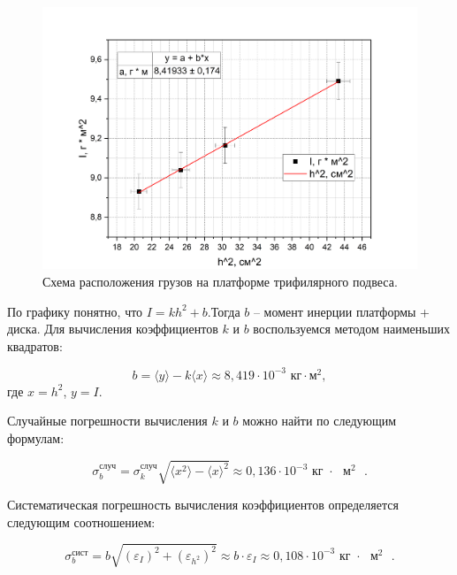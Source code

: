\documentclass[a4paper,12pt]{article}
\begin{document}
    \begin{figure}[H]
		\centering

		\includegraphics[width=1\textwidth]{FitLine.png}
		\caption{Схема расположения грузов на платформе трифилярного подвеса.}
	\end{figure}

    По графику понятно, что $I = kh^2 + b$.Тогда $b$ -- момент инерции платформы + диска. Для вычисления коэффициентов $ k $ и $ b $ воспользуемся методом наименьших квадратов:
	
	
	\begin{equation}
		b=\langle y \rangle -k\langle x \rangle\approx 8,419\cdot 10^{-3}\text{ кг} \cdot \text{м}^2,
	\end{equation}
	где $ x=h^2 $, $ y=I $.
	
	Случайные погрешности вычисления $ k $ и $ b $ можно найти по следующим формулам:
	
	\begin{equation}
		\sigma_b^\text{случ}= \sigma_k^\text{случ} \sqrt{\langle x^2 \rangle - \langle x \rangle^2} \approx 0,136 \cdot 10^{-3} \text{ кг $\cdot$ $\text{м}^2$ }.
	\end{equation}
	
	Систематическая погрешность вычисления коэффициентов определяется следующим соотношением:
	
	\begin{equation}
		\sigma^\text{сист}_b = b\sqrt{\left( \varepsilon_{I} \right)^2 + \left( \varepsilon_{h^2} \right)^2 } \approx b \cdot \varepsilon_I \approx 0,108 \cdot 10^{-3} \text{ кг $\cdot$ $\text{м}^2$ }.
	\end{equation}
	
\end{document}
